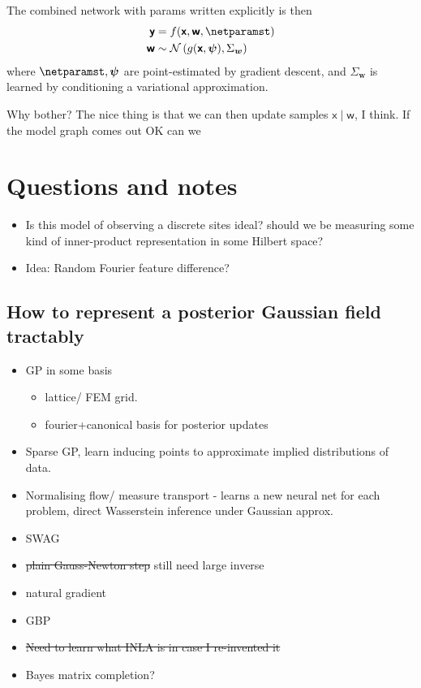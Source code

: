 \documentclass{article}
\newcommand{\vv}[1]{\boldsymbol{#1}}
\newcommand{\rv}[1]{\mathsf{#1}}
\newcommand{\vrv}[1]{\vv{\rv{#1}}}
\newcommand{\dist}[1]{\mathcal{#1}}
\newcommand{\gvn}{\mid}
\begin{document}
The combined network with params written explicitly is then
\begin{align*}
    \vrv{y} &=f(\vrv{x}, \vrv{w}, \netparamst) \\
    \vrv{w} & \sim \dist{N}\left(g(\vrv{x}, \vv{\psi}), \Sigma_{\vv{w}}\right)
\end{align*}
where \(\netparamst, \vv{\psi} \) are point-estimated by gradient descent, and \(\Sigma_{\vv{w}}\) is learned by conditioning a variational approximation.

Why bother? 
The nice thing is that we can then update samples \(\vrv{x}\gvn\vrv{w}\), I think.
If the model graph comes out OK can we 

\section{Questions and notes}

\begin{itemize}
    \item Is this model of observing a discrete sites ideal? should we be measuring some kind of inner-product representation in some Hilbert space?
    \item Idea: Random Fourier feature difference?
\end{itemize}

\subsection{How to represent a posterior Gaussian field tractably}

\begin{itemize}
    \item GP in some basis
    \begin{itemize}
        \item lattice/ FEM grid.
        \item fourier+canonical basis for posterior updates
    \end{itemize}
    \item Sparse GP, learn inducing points to approximate implied distributions of data.
    \item Normalising flow/ measure transport - learns a new neural net for each problem, direct Wasserstein inference under Gaussian approx.
    \item SWAG
    \item \sout{plain Gauss-Newton step} still need large inverse
    \item natural gradient
    \item GBP
    \item \sout{Need to learn what INLA is in case I re-invented it}
    \item Bayes matrix completion?
\end{itemize}
\end{document}
